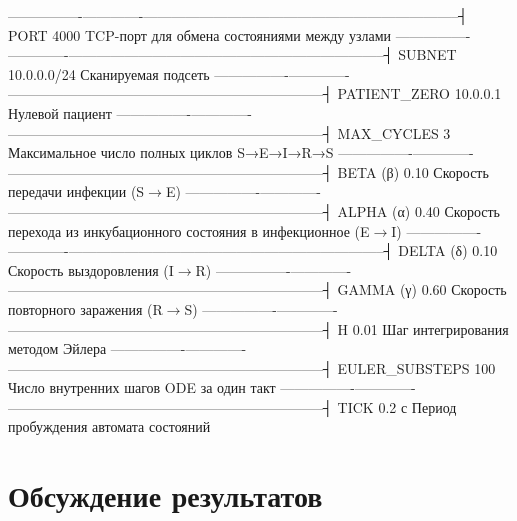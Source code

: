 \documentclass[
  english,
  russian,
  12pt,
  a4paper,
]{phdthesr}
\begin{document}
\textbar----------------\textbar-------------\textbar--------------------------------------------------------------------┤
\textbar{} PORT \textbar{} 4000 \textbar{} TCP-порт для обмена
состояниями между узлами \textbar{}
\textbar----------------\textbar-------------\textbar--------------------------------------------------------------------┤
\textbar{} SUBNET \textbar{} 10.0.0.0/24 \textbar{} Сканируемая подсеть
\textbar{}
\textbar----------------\textbar-------------\textbar--------------------------------------------------------------------┤
\textbar{} PATIENT\_ZERO \textbar{} 10.0.0.1 \textbar{} Нулевой пациент
\textbar{}
\textbar----------------\textbar-------------\textbar--------------------------------------------------------------------┤
\textbar{} MAX\_CYCLES \textbar{} 3 \textbar{} Максимальное число полных
циклов S→E→I→R→S \textbar{}
\textbar----------------\textbar-------------\textbar--------------------------------------------------------------------┤
\textbar{} BETA (β) \textbar{} 0.10 \textbar{} Скорость передачи
инфекции (S\(\rightarrow\)E) \textbar{}
\textbar----------------\textbar-------------\textbar--------------------------------------------------------------------┤
\textbar{} ALPHA (α) \textbar{} 0.40 \textbar{} Скорость перехода из
инкубационного состояния в инфекционное (E\(\rightarrow\)I) \textbar{}
\textbar----------------\textbar-------------\textbar--------------------------------------------------------------------┤
\textbar{} DELTA (δ) \textbar{} 0.10 \textbar{} Скорость выздоровления
(I\(\rightarrow\)R) \textbar{}
\textbar----------------\textbar-------------\textbar--------------------------------------------------------------------┤
\textbar{} GAMMA (γ) \textbar{} 0.60 \textbar{} Скорость повторного
заражения (R\(\rightarrow\)S) \textbar{}
\textbar----------------\textbar-------------\textbar--------------------------------------------------------------------┤
\textbar{} H \textbar{} 0.01 \textbar{} Шаг интегрирования методом
Эйлера \textbar{}
\textbar----------------\textbar-------------\textbar--------------------------------------------------------------------┤
\textbar{} EULER\_SUBSTEPS \textbar{} 100 \textbar{} Число внутренних
шагов ODE за один такт \textbar{}
\textbar----------------\textbar-------------\textbar--------------------------------------------------------------------┤
\textbar{} TICK \textbar{} 0.2 с \textbar{} Период пробуждения автомата
состояний

\section{Обсуждение
результатов}\label{ux43eux431ux441ux443ux436ux434ux435ux43dux438ux435-ux440ux435ux437ux443ux43bux44cux442ux430ux442ux43eux432}
\end{document}

